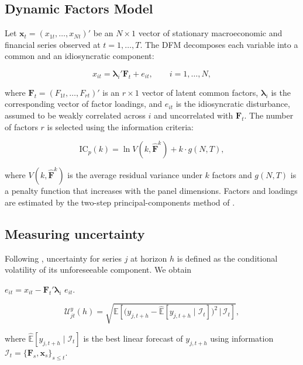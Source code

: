 \documentclass[12pt]{article}
\begin{document}
\subsection*{Dynamic Factors Model}
Let $\mathbf{x}_t = (x_{1t}, \ldots, x_{Nt})'$ be an $N \times 1$ vector of
stationary macroeconomic and financial series observed at $t = 1, \ldots, T$.
The DFM decomposes each variable into a common and an idiosyncratic component:

\begin{equation}\label{eq:dfm}
  x_{it} = \boldsymbol{\lambda}_i' \mathbf{F}_t + e_{it}, \qquad
  i = 1,\ldots,N,
\end{equation}

\noindent where $\mathbf{F}_t = (F_{1t},\ldots,F_{rt})'$ is an $r \times 1$
vector of latent common factors, $\boldsymbol{\lambda}_i$ is the corresponding
vector of factor loadings, and $e_{it}$ is the idiosyncratic disturbance,
assumed to be weakly correlated across $i$ and uncorrelated with
$\mathbf{F}_t$. The number of factors $r$ is selected using the
\cite{bai2002determining} information criteria:

\begin{equation}\label{eq:bai-ng}
  \mathrm{IC}_p(k) = \ln V(k, \hat{\mathbf{F}}^k) + k \cdot g(N,T),
\end{equation}

\noindent where $V(k,\hat{\mathbf{F}}^k)$ is the average residual variance
under $k$ factors and $g(N,T)$ is a penalty function that increases with the
panel dimensions. Factors and loadings are estimated by the two-step principal-components method of \cite{doz2012quasi}.


\subsection*{Measuring uncertainty}
Following \cite{jurado2015measuring}, uncertainty for series $j$ at horizon $h$ is defined as the conditional
volatility of its unforeseeable component. We obtain

$e_{it} = x_{it} - \mathbf{F}_t'\boldsymbol{\lambda}_i$
$e_{it}$.


\begin{equation}\label{eq:jln}
  \mathcal{U}^y_{jt}(h) =
    \sqrt{\mathbb{E}\!\left[
      \bigl(y_{j,t+h} - \hat{\mathbb{E}}[y_{j,t+h} \mid \mathcal{I}_t]
      \bigr)^2 \,\Big|\, \mathcal{I}_t
    \right]},
\end{equation}

\noindent where $\hat{\mathbb{E}}[y_{j,t+h} \mid \mathcal{I}_t]$ is the
best linear forecast of $y_{j,t+h}$ using information
$\mathcal{I}_t = \{\mathbf{F}_s, \mathbf{x}_s\}_{s \leq t}$. 
\end{document}
